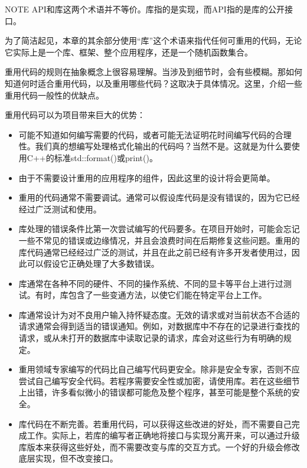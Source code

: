 \begin{myNotic}{NOTE}
API和库这两个术语并不等价。库指的是实现，而API指的是库的公开接口。
\end{myNotic}

为了简洁起见，本章的其余部分使用“库”这个术语来指代任何可重用的代码，无论它实际上是一个库、框架、整个应用程序，还是一个随机函数集合。


重用代码的规则在抽象概念上很容易理解。当涉及到细节时，会有些模糊。那如何知道何时适合重用代码，以及重用哪些代码？这取决于具体情况。这里，介绍一些重用代码一般性的优缺点。


重用代码可以为项目带来巨大的优势：

\begin{itemize}
\item
可能不知道如何编写需要的代码，或者可能无法证明花时间编写代码的合理性。我们真的想编写处理格式化输出的代码吗？当然不是。这就是为什么要使用C++的标准std::format()或print()。

\item
由于不需要设计重用的应用程序的组件，因此这里的设计将会更简单。

\item
重用的代码通常不需要调试。通常可以假设库代码是没有错误的，因为它已经经过广泛测试和使用。

\item
库处理的错误条件比第一次尝试编写的代码要多。在项目开始时，可能会忘记一些不常见的错误或边缘情况，并且会浪费时间在后期修复这些问题。重用的库代码通常已经经过广泛的测试，并且在此之前已经有许多开发者使用过，因此可以假设它正确处理了大多数错误。

\item
库通常在各种不同的硬件、不同的操作系统、不同的显卡等平台上进行过测试。有时，库包含了一些变通方法，以使它们能在特定平台上工作。

\item
库通常设计为对不良用户输入持怀疑态度。无效的请求或对当前状态不合适的请求通常会得到适当的错误通知。例如，对数据库中不存在的记录进行查找的请求，或从未打开的数据库中读取记录的请求，库会对这些行为有明确的规定。

\item
重用领域专家编写的代码比自己编写代码更安全。除非是安全专家，否则不应尝试自己编写安全代码。若程序需要安全性或加密，请使用库。若在这些细节上出错，许多看似微小的错误都可能危及整个程序，甚至可能是整个系统的安全。

\item
库代码在不断完善。若重用代码，可以获得这些改进的好处，而不需要自己完成工作。实际上，若库的编写者正确地将接口与实现分离开来，可以通过升级库版本来获得这些好处，而不需要改变与库的交互方式。一个好的升级会修改底层实现，但不改变接口。
\end{itemize}

